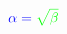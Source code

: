 \documentclass[]{article}
\begin{document}
\Huge %

\begin{align*}
\color{blue}
\alpha=
\color{green}
\sqrt{\beta}
\end{align*}

\end{document}
